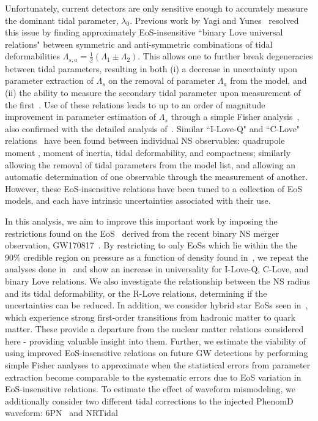 \documentclass[prd,twocolumn,nofootinbib,superscriptaddress,amsmath,amssymb]{revtex4-1}
\begin{document}
Unfortunately, current detectors are only sensitive enough to accurately measure the dominant tidal parameter, $\lambda_0$.
Previous work by Yagi and Yunes~\cite{Yagi:binLove} resolved this issue by finding approximately EoS-insensitive ``binary Love universal relations" between symmetric and anti-symmetric combinations of tidal deformabilities $\Lambda_{s,a}=\frac{1}{2}(\Lambda_1 \pm \Lambda_2)$.
This allows one to further break degeneracies between tidal parameters, resulting in both (i) a decrease in uncertainty upon parameter extraction of $\Lambda_s$ on the removal of parameter $\Lambda_a$ from the model, and (ii) the ability to measure the secondary tidal parameter upon measurement of the first~\cite{Katerina:residuals}.  
Use of these relations leads to up to an order of magnitude improvement in parameter estimation of $\Lambda_s$ through a simple Fisher analysis~\cite{Yagi:binLove}, also confirmed with the detailed analysis of~\cite{Katerina:residuals}.
Similar ``I-Love-Q" and ``C-Love" relations~\cite{Yagi:ILQ} have been found between individual NS observables: quadrupole moment , moment of inertia, tidal deformability, and compactness; similarly allowing the removal of tidal parameters from the model list, and allowing an automatic determination of one observable through the measurement of another.
However, these EoS-insensitive relations have been tuned to a collection of EoS models, and each have intrinsic uncertainties associated with their use.

In this analysis, we aim to improve this important work by imposing the restrictions found on the EoS~\cite{LIGO:posterior} derived from the recent binary NS merger observation, GW170817~\cite{TheLIGOScientific:2017qsa}.
By restricting to only EoSs which lie within the the 90\% credible region on pressure as a function of density found in~\cite{LIGO:posterior}, we repeat the analyses done in~\cite{Yagi:binLove,Yagi:ILQ} and show an increase in universality for I-Love-Q, C-Love, and binary Love relations.
We also investigate the relationship between the NS radius and its tidal deformability, or the R-Love relations, determining if the uncertainties can be reduced.
In addition, we consider hybrid star EoSs seen in~\cite{Paschalidis2018}, which experience strong first-order transitions from hadronic matter to quark matter.
These provide a departure from the nuclear matter relations considered here - providing valuable insight into them.
Further, we estimate the viability of using improved EoS-insensitive relations on future GW detections by performing simple Fisher analyses to approximate when the statistical errors from parameter extraction become comparable to the systematic errors due to EoS variation in EoS-insensitive relations.
To estimate the effect of waveform mismodeling, we additionally consider two different tidal corrections to the injected PhenomD~\cite{PhenomDI,PhenomDII} waveform: 6PN~\cite{Wade:tidalCorrections} and NRTidal~\cite{Samajdar:NRTidal}
\end{document}
